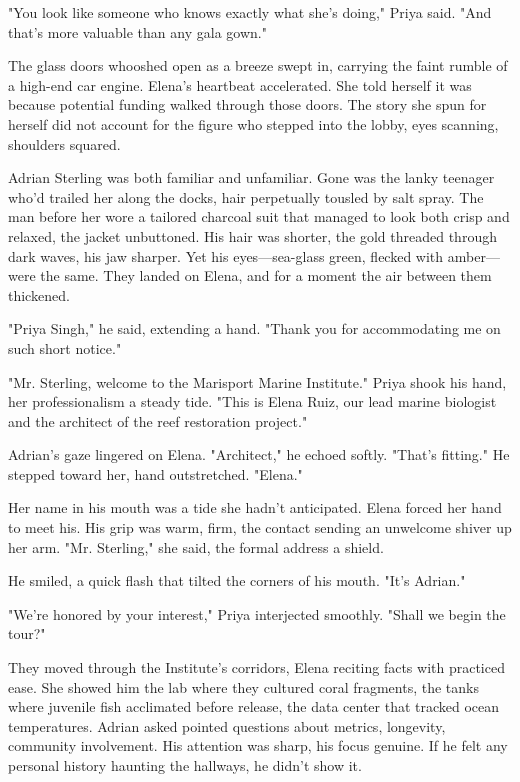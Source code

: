 "You look like someone who knows exactly what she's doing," Priya said. "And that's more valuable than any gala gown."

The glass doors whooshed open as a breeze swept in, carrying the faint rumble of a high-end car engine. Elena's heartbeat accelerated. She told herself it was because potential funding walked through those doors. The story she spun for herself did not account for the figure who stepped into the lobby, eyes scanning, shoulders squared.

Adrian Sterling was both familiar and unfamiliar. Gone was the lanky teenager who'd trailed her along the docks, hair perpetually tousled by salt spray. The man before her wore a tailored charcoal suit that managed to look both crisp and relaxed, the jacket unbuttoned. His hair was shorter, the gold threaded through dark waves, his jaw sharper. Yet his eyes—sea-glass green, flecked with amber—were the same. They landed on Elena, and for a moment the air between them thickened.

"Priya Singh," he said, extending a hand. "Thank you for accommodating me on such short notice."

"Mr. Sterling, welcome to the Marisport Marine Institute." Priya shook his hand, her professionalism a steady tide. "This is Elena Ruiz, our lead marine biologist and the architect of the reef restoration project."

Adrian's gaze lingered on Elena. "Architect," he echoed softly. "That's fitting." He stepped toward her, hand outstretched. "Elena."

Her name in his mouth was a tide she hadn't anticipated. Elena forced her hand to meet his. His grip was warm, firm, the contact sending an unwelcome shiver up her arm. "Mr. Sterling," she said, the formal address a shield.

He smiled, a quick flash that tilted the corners of his mouth. "It's Adrian."

"We're honored by your interest," Priya interjected smoothly. "Shall we begin the tour?"

They moved through the Institute's corridors, Elena reciting facts with practiced ease. She showed him the lab where they cultured coral fragments, the tanks where juvenile fish acclimated before release, the data center that tracked ocean temperatures. Adrian asked pointed questions about metrics, longevity, community involvement. His attention was sharp, his focus genuine. If he felt any personal history haunting the hallways, he didn't show it.

